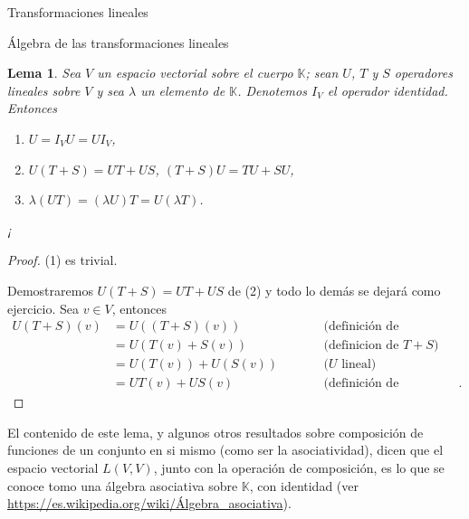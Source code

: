 \documentclass[a4paper,12pt,twoside,spanish]{amsbook}
\newtheorem{lema}[teorema]{Lema}
\theoremstyle{definition}
\theoremstyle{remark}
\newcommand{\K}{\mathbb K}
\begin{document}
\begin{chapter}{Transformaciones lineales}
\begin{section}{Álgebra de las transformaciones lineales}
		\begin{lema}
			Sea $V$ un espacio vectorial sobre el cuerpo $\K$; sean $U$, $T$ y $S$ operadores lineales sobre $V$ y sea $\lambda$ un elemento de $\K$. Denotemos $I_V$ el operador identidad. Entonces
			\begin{enumerate}
				\item $U = I_VU = UI_V$,
				\item $U(T+S) = UT + US$, $(T+S)U = TU + SU$,
				\item $\lambda (UT) = (\lambda U)T = U (\lambda T)$.
			\end{enumerate}¡
		\end{lema}
		\begin{proof}
			(1) es trivial. 
			
			Demostraremos $U(T+S) = UT + US$ de (2) y todo lo demás se dejará como ejercicio.
			Sea $ v \in V$, entonces
			\begin{equation*}
			\begin{array}{rlll}
			U(T+S)(v) &= U((T+S)(v))&\qquad&\text{(definición de composición)} \\
			&= U(T(v)+S(v))&\qquad&\text{(definicion  de $T+S$)} \\
			&= U(T(v))+U(S(v))&\qquad&\text{($U$ lineal)} \\
			&= UT(v)+US(v)&\qquad&\text{(definición de composición)}.
			\end{array}
			\end{equation*}  
		\end{proof}	
	
	El contenido de este lema, y algunos otros resultados  sobre composición de funciones de un conjunto en si mismo (como ser la asociatividad), dicen que el espacio vectorial $L(V, V)$, junto con la operación de composición, es lo que se conoce tomo una  álgebra asociativa sobre $\K$,  con identidad (ver \href{https://es.wikipedia.org/wiki/Álgebra\_asociativa}{https://es.wikipedia.org/wiki/Álgebra\_asociativa}). 
	
	

		\end{section}
	

\end{chapter}
\end{document}
